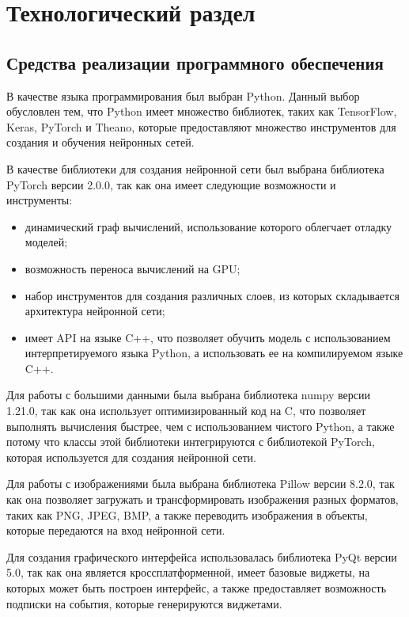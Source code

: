 \chapter{Технологический раздел}

\section{Средства реализации программного обеспечения}

В качестве языка программирования был выбран Python. Данный выбор обусловлен тем, что Python имеет множество библиотек, таких как TensorFlow, Keras, PyTorch и Theano, которые предоставляют множество инструментов для создания и обучения нейронных сетей.

В качестве библиотеки для создания нейронной сети был выбрана библиотека PyTorch версии 2.0.0, так как она имеет следующие возможности и инструменты:
\begin{itemize}
	\item динамический граф вычислений, использование которого облегчает отладку моделей;
	\item возможность переноса вычислений на GPU;
	\item набор инструментов для создания различных слоев, из которых складывается архитектура нейронной сети;
	\item имеет API на языке C++, что позволяет обучить модель с использованием интерпретируемого языка Python, а использовать ее на компилируемом языке C++.
\end{itemize}

Для работы с большими данными была выбрана библиотека numpy версии 1.21.0, так как она использует оптимизированный код на C, что позволяет выполнять вычисления быстрее, чем с использованием чистого Python, а также потому что классы этой библиотеки интегрируются с библиотекой PyTorch, которая используется для создания нейронной сети.

Для работы с изображениями была выбрана библиотека Pillow версии 8.2.0, так как она позволяет загружать и трансформировать изображения разных форматов, таких как PNG, JPEG, BMP, а также переводить изображения в объекты, которые передаются на вход нейронной сети.

Для создания графического интерфейса использовалась библиотека PyQt версии 5.0, так как она является кроссплатформенной, имеет базовые виджеты, на которых может быть построен интерфейс, а также предоставляет возможность подписки на события, которые генерируются виджетами.

